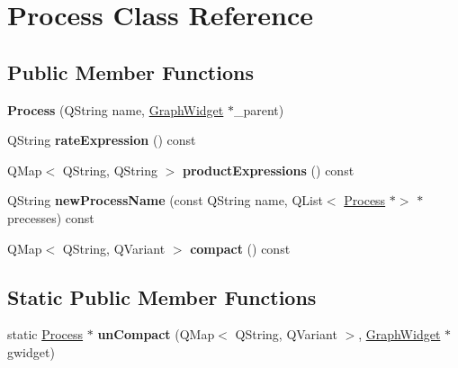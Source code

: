 \hypertarget{class_process}{}\section{Process Class Reference}
\label{class_process}
\subsection*{Public Member Functions}
\begin{DoxyCompactItemize}
\item 
\mbox{\label{class_process_ab80ee1c41db16d2dec303317b8364cd6}} 
{\bfseries Process} (Q\+String name, \hyperlink{class_graph_widget}{Graph\+Widget} $\ast$\+\_\+parent)
\item 
\mbox{\label{class_process_a815a278a9eb6355739a6c32f9542ca04}} 
Q\+String {\bfseries rate\+Expression} () const
\item 
\mbox{\label{class_process_a9fd5541ab8d37dd39fe13fc51a24b846}} 
Q\+Map$<$ Q\+String, Q\+String $>$ {\bfseries product\+Expressions} () const
\item 
\mbox{\label{class_process_ac4148cd83e0edf43eeb618c3a88b553d}} 
Q\+String {\bfseries new\+Process\+Name} (const Q\+String name, Q\+List$<$ \hyperlink{class_process}{Process} $\ast$$>$ $\ast$precesses) const
\item 
\mbox{\label{class_process_aec2bc2f4bced30d08facf3642d5d88dd}} 
Q\+Map$<$ Q\+String, Q\+Variant $>$ {\bfseries compact} () const
\end{DoxyCompactItemize}
\subsection*{Static Public Member Functions}
\begin{DoxyCompactItemize}
\item 
\mbox{\label{class_process_a3f64e12d2480a93f97c458bb35c3f37a}} 
static \hyperlink{class_process}{Process} $\ast$ {\bfseries un\+Compact} (Q\+Map$<$ Q\+String, Q\+Variant $>$, \hyperlink{class_graph_widget}{Graph\+Widget} $\ast$gwidget)
\end{DoxyCompactItemize}
